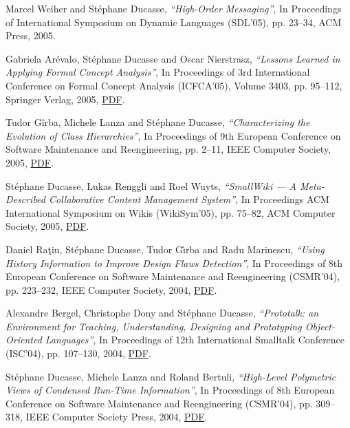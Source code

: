 \documentclass{article}
\newcommand{\czauthors}[1]{#1}
\newcommand{\cztitle}[1]{\emph{``#1''}}
\newcommand{\czbooktitle}[1]{#1}
\begin{document}
\begin{itemize}
	\pub  \czauthors{Marcel Weiher and St\'ephane Ducasse},  \cztitle{High-Order Messaging},  In \czbooktitle{Proceedings of International Symposium on Dynamic Languages (SDL'05)}, pp. 23--34, ACM Press, 2005.

	\pub  \czauthors{Gabriela Ar{\'e}valo, St\'ephane Ducasse and Oscar Nierstrasz},  \cztitle{Lessons Learned in Applying Formal Concept Analysis},  In \czbooktitle{Proceedings of 3rd International Conference on Formal Concept Analysis (ICFCA'05)}, Volume 3403, pp. 95--112, Springer Verlag, 2005, \href{http://rmod-files.lille.inria.fr/Team/Texts/Papers/Arev05c-ICFCA05-LessonsLearned.pdf}{PDF}.

	\pub  \czauthors{Tudor G\^irba, Michele Lanza and St\'ephane Ducasse},  \cztitle{Characterizing the Evolution of Class Hierarchies},  In \czbooktitle{Proceedings of 9th European Conference on Software Maintenance and Reengineering}, pp. 2--11, IEEE Computer Society, 2005, \href{http://rmod-files.lille.inria.fr/Team/Texts/Papers/Girb05aHierarchiesEvolution.pdf}{PDF}.

	\pub  \czauthors{St\'ephane Ducasse, Lukas Renggli and Roel Wuyts},  \cztitle{{SmallWiki} --- A Meta-Described Collaborative Content Management System},  In \czbooktitle{Proceedings ACM International Symposium on Wikis (WikiSym'05)}, pp. 75--82, ACM Computer Society, 2005, \href{http://rmod-files.lille.inria.fr/Team/Texts/Papers/Duca05hSmallwikiWikiSymp05.pdf}{PDF}.

	\pub  \czauthors{Daniel Ra{\c t}iu, St\'ephane Ducasse, Tudor G{\^\i}rba and Radu Marinescu},  \cztitle{Using History Information to Improve Design Flaws Detection},  In \czbooktitle{Proceedings of 8th European Conference on Software Maintenance and Reengineering (CSMR'04)}, pp. 223--232, IEEE Computer Society, 2004, \href{http://rmod-files.lille.inria.fr/Team/Texts/Papers/Rati04aHistoryImproveFlawsDetection.pdf}{PDF}.

	\pub  \czauthors{Alexandre Bergel, Christophe Dony and St\'ephane Ducasse},  \cztitle{Prototalk: an Environment for Teaching, Understanding, Designing and Prototyping Object-Oriented Languages},  In \czbooktitle{Proceedings of 12th International Smalltalk Conference (ISC'04)}, pp. 107--130, 2004, \href{http://rmod-files.lille.inria.fr/Team/Texts/Papers/Berg04c-ISC04-prototalk.pdf}{PDF}.

	\pub  \czauthors{St\'ephane Ducasse, Michele Lanza and Roland Bertuli},  \cztitle{High-Level Polymetric Views of Condensed Run-Time Information},  In \czbooktitle{Proceedings of 8th European Conference on Software Maintenance and Reengineering (CSMR'04)}, pp. 309--318, IEEE Computer Society Press, 2004, \href{http://rmod-files.lille.inria.fr/Team/Texts/Papers/Duca04aRuntimePolymetricViews.pdf}{PDF}.


\end{itemize}
\end{document}
